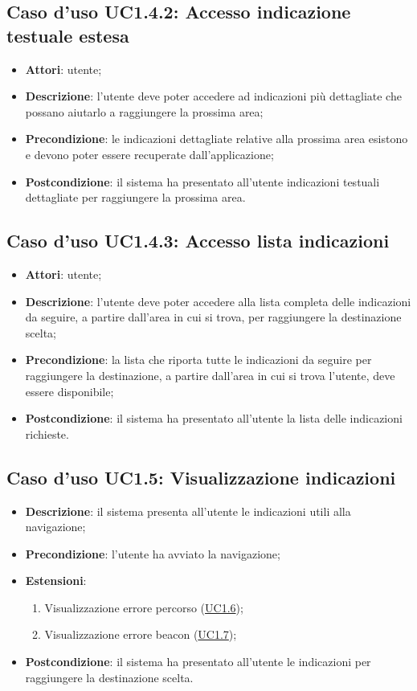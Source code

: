 \documentclass[../AnalisiDeiRequisiti.tex]{subfiles}
\begin{document}
\subsection{Caso d'uso UC1.4.2: Accesso indicazione testuale estesa}
\begin{itemize}
\item \textbf{Attori}: utente;
\item \textbf{Descrizione}: l'utente deve poter accedere ad indicazioni più dettagliate che possano aiutarlo a raggiungere la prossima area; 
      \item \textbf{Precondizione}: le indicazioni dettagliate relative alla prossima area esistono e devono poter essere recuperate dall'applicazione;
    \item \textbf{Postcondizione}: il sistema ha presentato all'utente indicazioni testuali dettagliate per raggiungere la prossima area.
  \end{itemize}
\hypertarget{UC1.4.3}{}
\subsection{Caso d'uso UC1.4.3: Accesso lista indicazioni}
\begin{itemize}
\item \textbf{Attori}: utente;
\item \textbf{Descrizione}: l'utente deve poter accedere alla lista completa delle indicazioni da seguire, a partire dall'area in cui si trova, per raggiungere la destinazione scelta; 
      \item \textbf{Precondizione}: la lista che riporta tutte le indicazioni da seguire per raggiungere la destinazione, a partire dall'area in cui si trova l'utente, deve essere disponibile;
    \item \textbf{Postcondizione}: il sistema ha presentato all'utente la lista delle indicazioni richieste.
  \end{itemize}
\hypertarget{UC1.5}{}
\subsection{Caso d'uso UC1.5: Visualizzazione indicazioni}
\begin{itemize}

\item \textbf{Descrizione}: il sistema presenta all'utente le indicazioni utili alla navigazione; 
      \item \textbf{Precondizione}: l'utente ha avviato la navigazione;
    \item \textbf{Estensioni}:
      \begin{enumerate}
          \item Visualizzazione errore percorso (\hyperlink{UC1.6}{UC1.6});
          \item Visualizzazione errore beacon (\hyperlink{UC1.7}{UC1.7});

      \end{enumerate}
    \item \textbf{Postcondizione}: il sistema ha presentato all'utente le indicazioni per raggiungere la destinazione scelta.
  \end{itemize}
\hypertarget{UC1.6}{}
\end{document}
